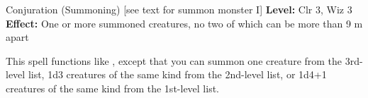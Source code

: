 {Conjuration (Summoning) [see text for summon monster I]}
{
	\textbf{Level:}
	Clr 3, Wiz 3\\
	\textbf{Effect:}
	One or more summoned creatures, no two of which can be more than 9 m apart\\
}
{
	This spell functions like , except that you can summon one creature from the 3rd-level list, 1d3 creatures of the same kind from the 2nd-level list, or 1d4+1 creatures of the same kind from the 1st-level list.

}
